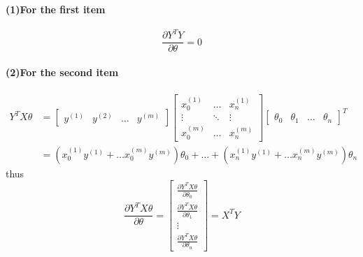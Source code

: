 \documentclass[UTF8]{article}
\begin{document}
\paragraph{(1)For the first item}
$$\frac{\partial Y^TY}{\partial\theta} = 0$$
\paragraph{(2)For the second item}
\begin{align*}
  Y^TX\theta &=
  \left[
  \begin{matrix}
  y^{(1)} & y^{(2)} & \dots & y^{(m)}
  \end{matrix}
  \right]
  \left[
  \begin{matrix}
      x_0^{(1)} & \dots &x_n^{(1)} \\
      \vdots & \ddots & \vdots \\
      x_0^{(m)} & \dots & x_n^{(m)}
  \end{matrix}
 \right]
  \left[
  \begin{matrix}
    \theta_0 & \theta_1 & \dots & \theta_n
  \end{matrix}
  \right]^T \\
  &= \left(x_0^{(1)}y^{(1)} + \dots x_0^{(m)}y^{(m)} \right)\theta_0
  + \dots + \left(x_n^{(1)}y^{(1)} + \dots x_n^{(m)}y^{(m)} \right)\theta_n
\end{align*}
thus
$$
  \frac{\partial Y^TX\theta}{\partial\theta} = \left[
  \begin{matrix}
    \frac{\partial Y^TX\theta}{\partial\theta_0} \\
    \frac{\partial Y^TX\theta}{\partial\theta_1} \\
    \vdots \\
    \frac{\partial Y^TX\theta}{\partial\theta_n}
  \end{matrix}
  \right] = X^TY
$$
\end{document}
